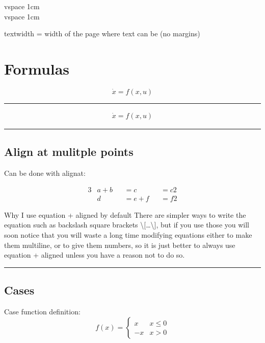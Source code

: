 \documentclass[12pt]{article}
\newcommand{\inOut}[1]{#1}                %
\begin{document}
    vspace 1cm \\[1cm]

    vspace 1cm

  textwidth = width of the page where text can be (no margins)

\section{Formulas}\label{formulas}

  \begin{example}\label{expFor2}
    \inOut{
      \begin{equation*}\label{eqFor2}
        \dot{x} = f(x,u)
      \end{equation*}
    }
  \end{example}\hrule

  \begin{example}\label{expFor1}
    \inOut{
      \begin{equation}\begin{aligned}\label{eqFor1}
        \dot{x} = f(x,u)
      \end{aligned}\end{equation}
    }
  \end{example}\hrule

  \subsection{Align at mulitple points}\label{alignMult}
    Can be done with alignat:

      \begin{alignat*}{3}
        & a + b && = c   && = c2 \\
        & d   && = e + f && = f2
      \end{alignat*}

  \begin{remark}\label{remFor1} Why I use equation + aligned by default
    There are simpler ways to write the equation such as backslash square brackets \textbackslash{}[\ldots\textbackslash{}],
    but if you use those you will soon notice that you will waste a long time modifying equations
    either to make them multiline, or to give them numbers, so it is just better to always use
    equation + aligned unless you have a reason not to do so.
  \end{remark}\hrule

  \subsection{Cases}\label{cases}
    Case function definition:
    \begin{equation}
      f(x) =
      \begin{cases}
        x & x \le 0 \\
        -x & x>0
      \end{cases}
    \end{equation}
\end{document}
